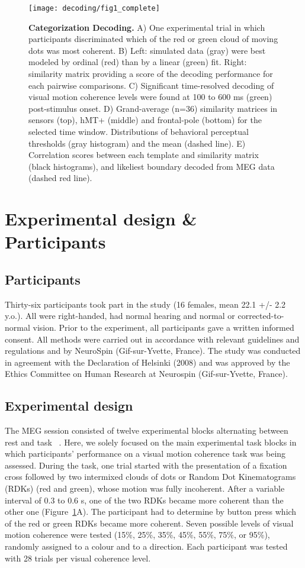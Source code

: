 \begin{figure}
\centering
	\texttt{[image: decoding/fig1\_complete]}
    \caption{{\bf Categorization Decoding.} A) One experimental trial in which participants discriminated  which of the red or green cloud of moving dots was most coherent. B) Left: simulated data (gray) were best modeled by ordinal (red) than by a linear (green) fit. Right: similarity matrix providing a score of the decoding performance for each pairwise comparisons. C) Significant time-resolved decoding of visual motion coherence levels were found at 100 to 600 ms (green) post-stimulus onset. D) Grand-average (n=36) similarity matrices in sensors (top), hMT+ (middle) and frontal-pole (bottom) for the selected time window. Distributions of behavioral perceptual thresholds (gray histogram) and the mean (dashed line). E) Correlation scores between each template and similarity matrix (black histograms), and likeliest boundary decoded from MEG data (dashed red line).}\label{fig:fig1}
\end{figure}


\section{Experimental design \& Participants}
\subsection*{Participants}
Thirty-six participants took part in the study (16 females, mean 22.1 +/- 2.2 y.o.). All were right-handed, had normal hearing and normal or corrected-to-normal vision. Prior to the experiment, all participants gave a written informed consent. All methods were carried out in accordance with relevant guidelines and regulations and by NeuroSpin (Gif-sur-Yvette, France). The study was conducted in agreement with the Declaration of Helsinki (2008) and was approved by the Ethics Committee on Human Research at Neurospin (Gif-sur-Yvette, France). 

\subsection*{Experimental design}
The MEG session consisted of twelve experimental blocks alternating between rest and task ~\cite{23zilber2014supramodal}. Here, we solely focused on the main experimental task blocks in which participants' performance on a visual motion coherence task was being assessed. During the task, one trial started with the presentation of a fixation cross followed by two intermixed clouds of dots or Random Dot Kinematograms (RDKs) (red and green), whose motion was fully incoherent. After a variable interval of 0.3 to 0.6 s, one of the two RDKs became more coherent than the other one (Figure~\ref{fig:fig1}A). The participant had to determine by button press which of the red or green RDKs became more coherent. Seven possible levels of visual motion coherence were tested (15\%, 25\%, 35\%, 45\%, 55\%, 75\%, or 95\%), randomly assigned to a colour and to a direction. Each participant was tested with 28 trials per visual coherence level.

